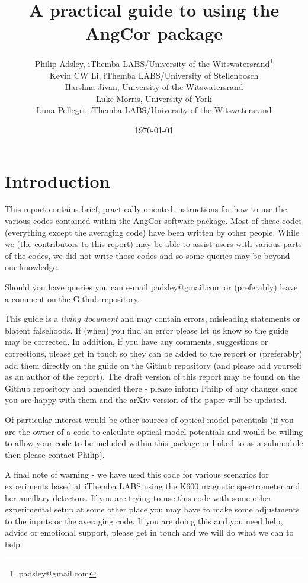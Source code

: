 \documentclass[a4paper,10pt]{article}
\title{A practical guide to using the AngCor package}
\author{Philip Adsley, iThemba LABS/University of the Witswatersrand\footnote{padsley@gmail.com}\\
Kevin CW Li, iThemba LABS/University of Stellenbosch\\
Harshna Jivan, University of the Witswatersrand\\
Luke Morris, University of York\\
Luna Pellegri, iThemba LABS/University of the Witswatersrand}
\date{\today}
\begin{document}
\lstset{language=bash}
\maketitle

\section{Introduction}

This report contains brief, practically oriented instructions for how to use the various codes contained within the AngCor software package. Most of these codes (everything except the averaging code) have been written by other people. While we (the contributors to this report) may be able to assist users with various parts of the codes, we did not write those codes and so some queries may be beyond our knowledge.

Should you have queries you can e-mail padsley@gmail.com or (preferably) leave a comment on the \href{https://github.com/padsley/AngCorPackage}{Github repository}.

This guide is a {\it living document} and may contain errors, misleading statements or blatent falsehoods. If (when) you find an error please let us know so the guide may be corrected. In addition, if you have any comments, suggestions or corrections, please get in touch so they can be added to the report or (preferably) add them directly on the guide on the Github repository (and please add yourself as an author of the report). The draft version of this report may be found on the Github repository and amended there - please inform Philip of any changes once you are happy with them and the arXiv version of the paper will be updated.

Of particular interest would be other sources of optical-model potentials (if you are the owner of a code to calculate optical-model potentials and would be willing to allow your code to be included within this package or linked to as a submodule then please contact Philip).

A final note of warning - we have used this code for various scenarios for experiments based at iThemba LABS using the K600 magnetic spectrometer and her ancillary detectors. If you are trying to use this code with some other experimental setup at some other place you may have to make some adjustments to the inputs or the averaging code. If you are doing this and you need help, advice or emotional support, please get in touch and we will do what we can to help.
\end{document}
